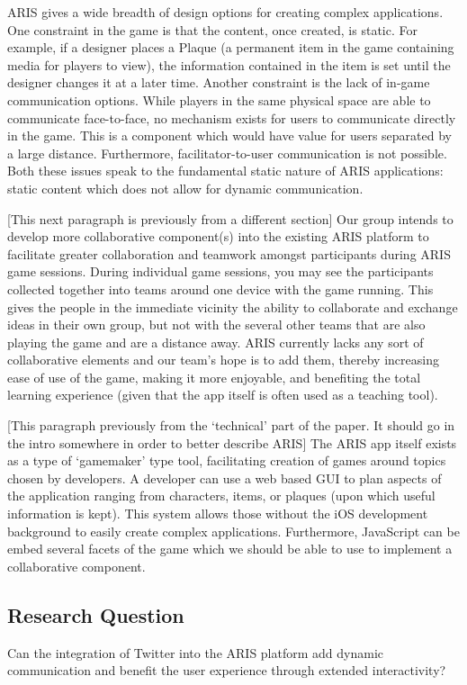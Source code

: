 \documentclass{sigchi}
\begin{document}
ARIS gives a wide breadth of design options for creating complex applications. One constraint in the game is that the content, once created, is static. For example, if a designer places a Plaque (a permanent item in the game containing media for players to view), the information contained in the item is set until the designer changes it at a later time. Another constraint is the lack of in-game communication options. While players in the same physical space are able to communicate face-to-face, no mechanism exists for users to communicate directly in the game. This is a component which would have value for users separated by a large distance. Furthermore, facilitator-to-user communication is not possible. Both these issues speak to the fundamental static nature of ARIS applications: static content  which does not allow for dynamic communication.

[This next paragraph is previously from a different section]
Our group intends to develop more collaborative component(s) into the existing ARIS platform to facilitate greater collaboration and teamwork amongst participants during ARIS game sessions. During individual game sessions, you may see the participants collected together into teams around one device with the game running. This gives the people in the immediate vicinity the ability to collaborate and exchange ideas in their own group, but not with the several other teams that are also playing the game and are a distance away. ARIS currently lacks any sort of collaborative elements and our team’s hope is to add them, thereby increasing ease of use of the game, making it more enjoyable, and benefiting the total learning experience (given that the app itself is often used as a teaching tool).

[This paragraph previously from the `technical' part of the paper. It should go in the intro somewhere in order to better describe ARIS]
The ARIS app itself exists as a type of ‘gamemaker’ type tool, facilitating creation of games around topics chosen by developers. A developer can use a web based GUI to plan aspects of the application ranging from characters, items, or plaques (upon which useful information is kept). This system allows those without the iOS development background to easily create complex applications. Furthermore, JavaScript can be embed several facets of the game which we should be able to use to implement a collaborative component. 

\subsection{Research Question}
Can the integration of Twitter into the ARIS platform add dynamic communication and benefit the user experience through extended interactivity? 
\end{document}
